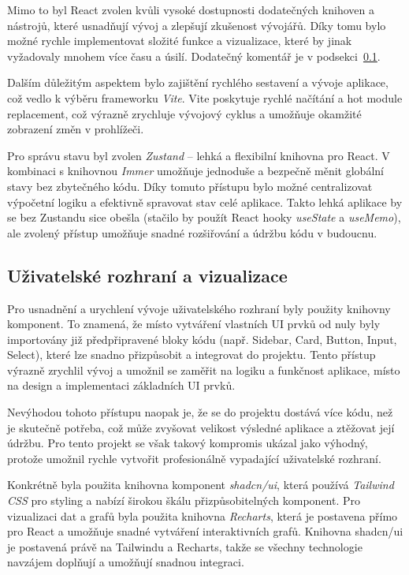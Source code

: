 Mimo to byl React zvolen kvůli vysoké dostupnosti dodatečných knihoven a nástrojů, které usnadňují vývoj a zlepšují zkušenost vývojářů. Díky tomu bylo možné rychle implementovat složité funkce a vizualizace, které by jinak vyžadovaly mnohem více času a úsilí. Dodatečný komentář je v podsekci~\ref{subsec:app_stack_ui}.

Dalším důležitým aspektem bylo zajištění rychlého sestavení a vývoje aplikace, což vedlo k výběru frameworku \textit{Vite}. Vite poskytuje rychlé načítání a hot module replacement, což výrazně zrychluje vývojový cyklus a umožňuje okamžité zobrazení změn v prohlížeči.

Pro správu stavu byl zvolen \textit{Zustand} -- lehká a flexibilní knihovna pro React. V kombinaci s knihovnou \textit{Immer} umožňuje jednoduše a bezpečně měnit globální stavy bez zbytečného kódu. Díky tomuto přístupu bylo možné centralizovat výpočetní logiku a efektivně spravovat stav celé aplikace. Takto lehká aplikace by se bez Zustandu sice obešla (stačilo by použít React hooky \textit{useState} a \textit{useMemo}), ale zvolený přístup umožňuje snadné rozšiřování a údržbu kódu v budoucnu.

\subsection{Uživatelské rozhraní a vizualizace}
\label{subsec:app_stack_ui}

Pro usnadnění a urychlení vývoje uživatelského rozhraní byly použity knihovny komponent. To znamená, že místo vytváření vlastních UI prvků od nuly byly importovány již předpřipravené bloky kódu (např. Sidebar, Card, Button, Input, Select), které lze snadno přizpůsobit a integrovat do projektu. Tento přístup výrazně zrychlil vývoj a umožnil se zaměřit na logiku a funkčnost aplikace, místo na design a implementaci základních UI prvků.

Nevýhodou tohoto přístupu naopak je, že se do projektu dostává více kódu, než je skutečně potřeba, což může zvyšovat velikost výsledné aplikace a ztěžovat její údržbu. Pro tento projekt se však takový kompromis ukázal jako výhodný, protože umožnil rychle vytvořit profesionálně vypadající uživatelské rozhraní.

Konkrétně byla použita knihovna komponent \textit{shadcn/ui}, která používá \textit{Tailwind CSS} pro styling a nabízí širokou škálu přizpůsobitelných komponent. Pro vizualizaci dat a grafů byla použita knihovna \textit{Recharts}, která je postavena přímo pro React a umožňuje snadné vytváření interaktivních grafů. Knihovna shadcn/ui je postavená právě na Tailwindu a Recharts, takže se všechny technologie navzájem doplňují a umožňují snadnou integraci.

